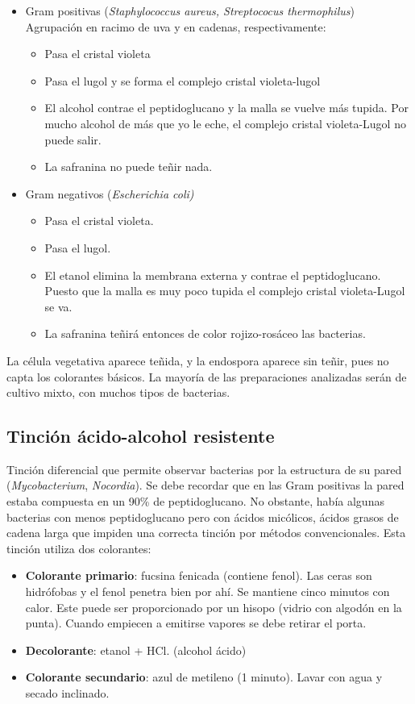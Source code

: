 \begin{itemize}[itemsep=0pt,parsep=0pt,topsep=0pt,partopsep=0pt]
	\item Gram positivas (\textit{Staphylococcus aureus, Streptococus thermophilus}) Agrupación en racimo de uva y en cadenas, respectivamente:
	\begin{itemize}[itemsep=0pt,parsep=0pt,topsep=0pt,partopsep=0pt]
		\item Pasa el cristal violeta
		\item Pasa el lugol y se forma el complejo cristal violeta-lugol
		\item El alcohol contrae el peptidoglucano y la malla se vuelve más tupida. Por mucho alcohol de más que yo le eche, el complejo cristal violeta-Lugol no puede salir.
		\item La safranina no puede teñir nada.
	\end{itemize}
	\item Gram negativos (\textit{Escherichia coli)}
	\begin{itemize}[itemsep=0pt,parsep=0pt,topsep=0pt,partopsep=0pt]
		\item Pasa el cristal violeta.
		\item Pasa el lugol.
		\item El etanol elimina la membrana externa y contrae el peptidoglucano. Puesto que la malla es muy poco tupida el complejo cristal violeta-Lugol se va.
		\item La safranina teñirá entonces de color rojizo-rosáceo las bacterias.
	\end{itemize}
\end{itemize}
La célula vegetativa aparece teñida, y la endospora aparece sin teñir, pues no capta los colorantes básicos. La mayoría de las preparaciones analizadas serán de cultivo mixto, con muchos tipos de bacterias.
\subsection{Tinción ácido-alcohol resistente} 
Tinción diferencial que permite observar bacterias por la estructura de su pared (\textit{Mycobacterium}, \textit{Nocordia}). Se debe recordar que en las Gram positivas la pared estaba compuesta en un 90\% de peptidoglucano. No obstante, había algunas bacterias con menos peptidoglucano pero con ácidos micólicos, ácidos grasos de cadena larga que impiden una correcta tinción por métodos convencionales. Esta tinción utiliza dos colorantes:
\begin{itemize}[itemsep=0pt,parsep=0pt,topsep=0pt,partopsep=0pt]
	\item \textbf{Colorante primario}: fucsina fenicada (contiene fenol). Las ceras son hidrófobas y el fenol penetra bien por ahí. Se mantiene cinco minutos con calor. Este puede ser proporcionado por un hisopo (vidrio con algodón en la punta). Cuando empiecen a emitirse vapores se debe retirar el porta. 
	\item \textbf{Decolorante}: etanol + HCl. (alcohol ácido)
	\item \textbf{Colorante secundario}: azul de metileno (1 minuto). Lavar con agua y secado inclinado.
\end{itemize}

